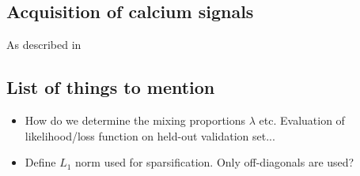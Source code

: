 \subsection*{Acquisition of calcium signals}
As described in \cite{Cotton:2013}



\subsection*{List of things to mention}

\begin{itemize}
\item How do we determine the mixing proportions $\lambda$ etc. Evaluation of likelihood/loss function on held-out validation set...

\item Define $L_1$ norm used for sparsification. Only off-diagonals are used?

\end{itemize}



